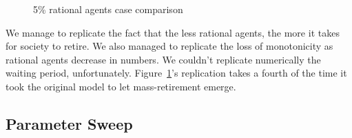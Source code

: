 \documentclass[runningheads,a4paper]{llncs}
\begin{document}
\begin{figure}
\centering

\caption{5\% rational agents case comparison}
\label{figure5}
\end{figure}

We manage to replicate the fact that the less rational agents, the more it takes for society to retire.
We also managed to replicate the loss of monotonicity as rational agents decrease in numbers.
We couldn't replicate numerically the waiting period, unfortunately.
Figure~\ref{figure5}'s replication takes a fourth of the time it took the original model to let mass-retirement emerge.



\subsection{Parameter Sweep}
\end{document}
